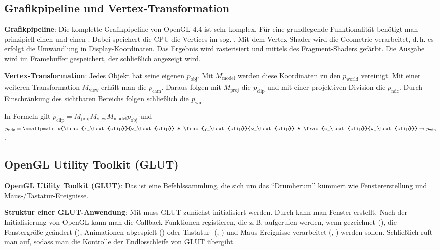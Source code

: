 \subsection{%
    Grafikpipeline und Vertex-Transformation%
}

\textbf{Grafikpipeline}:
Die komplette Grafikpipeline von OpenGL 4.4 ist sehr komplex.
Für eine grundlegende Funktionalität benötigt man prinzipiell einen
 und einen .
Dabei speichert die CPU die Vertices im sog. .
Mit dem Vertex-Shader wird die Geometrie verarbeitet, d.\,h. es erfolgt die Umwandlung in
Display-Koordinaten.
Das Ergebnis wird rasterisiert und mittels des Fragment-Shaders gefärbt.
Die Ausgabe wird im Framebuffer gespeichert, der schließlich angezeigt wird.

\textbf{Vertex-Transformation}:
Jedes Objekt hat seine eigenen  $p_\text{obj}$.
Mit $M_\text{model}$ werden diese Koordinaten zu den  $p_\text{world}$
vereinigt.
Mit einer weiteren Transformation $M_\text{view}$ erhält man die 
$p_\text{cam}$.
Daraus folgen mit $M_\text{proj}$ die  $p_\text{clip}$
und mit einer projektiven Division die  $p_\text{ndc}$.
Durch Einschränkung des sichtbaren Bereichs folgen schließlich die 
$p_\text{win}$.

In Formeln gilt $p_\text{clip} = M_\text{proj} M_\text{view} M_\text{model} p_\text{obj}$ und
$p_\text{ndc} = \smallpmatrix{\frac{x_\text{clip}}{w_\text{clip}} &
\frac{y_\text{clip}}{w_\text{clip}} & \frac{z_\text{clip}}{w_\text{clip}}} \to p_\text{win}$.

\pagebreak

\subsection{%
    OpenGL Utility Toolkit (GLUT)%
}

\textbf{OpenGL Utility Toolkit (GLUT)}:
Das  ist eine Befehlssammlung, die sich um das
"`Drumherum"' kümmert wie Fenstererstellung und Maus-/Tastatur-Ereignisse.

\textbf{Struktur einer GLUT-Anwendung}:
Mit  muss GLUT zunächst initialisiert werden.
Durch  kann man Fenster erstellt.
Nach der Initialisierung von OpenGL kann man die Callback-Funktionen registieren,
die z.\,B. aufgerufen werden, wenn
gezeichnet (),
die Fenstergröße geändert (),
Animationen abgespielt () oder
Tastatur- (, ) und
Maus-Ereignisse verarbeitet (, ) werden sollen.
Schließlich ruft man  auf, sodass man die Kontrolle der Endlosschleife von
GLUT übergibt.

